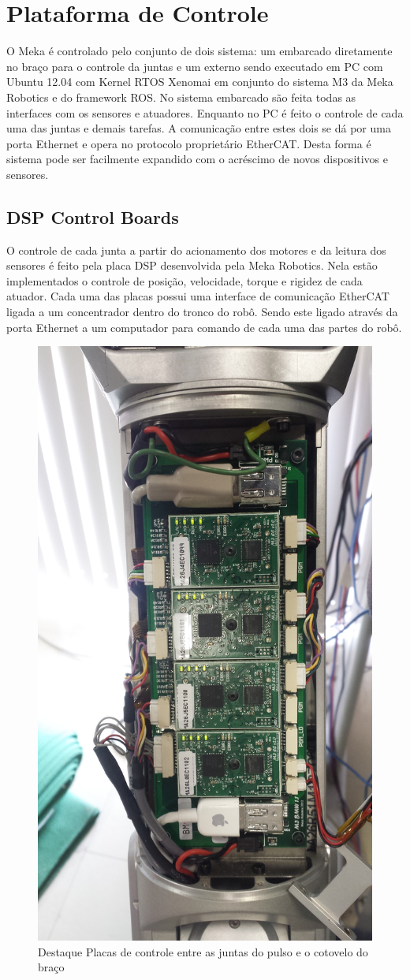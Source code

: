 
\section{Plataforma de Controle}

O Meka é controlado pelo conjunto de dois sistema: um embarcado diretamente no braço para o controle da juntas e um externo sendo executado em PC com Ubuntu 12.04 com Kernel RTOS Xenomai em conjunto do sistema M3 da Meka Robotics e do framework ROS. No sistema embarcado são feita todas as interfaces com os sensores e atuadores. Enquanto no PC é feito o controle de cada uma das juntas e demais tarefas. A comunicação entre estes dois se dá por uma porta Ethernet e opera no protocolo proprietário EtherCAT. Desta forma é sistema pode ser facilmente expandido com o acréscimo de novos dispositivos e sensores.

\subsection{DSP Control Boards}
O controle de cada junta a partir do acionamento dos motores e da leitura dos sensores é feito pela placa DSP desenvolvida pela Meka Robotics. Nela estão implementados o controle de posição, velocidade, torque e rigidez de cada atuador. Cada uma das placas possui uma interface de comunicação EtherCAT ligada a um concentrador dentro do tronco do robô. Sendo este ligado através da porta Ethernet a um computador para comando de cada uma das partes do robô.

\begin{figure}[H]
    \centering
    \includegraphics[angle=90,width=0.9\linewidth,height=0.5\linewidth]{figs/dsp-control-wrist}
    \caption{Destaque Placas de controle entre as juntas do pulso e o cotovelo do braço}
    \label{fig:dsp-control-wrist}
\end{figure}


